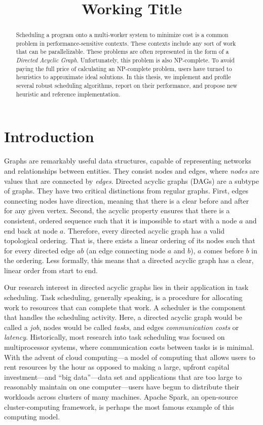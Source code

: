 \documentclass[11pt, oneside]{article}   	%
\title{Working Title}
\date{}
\begin{document}
\maketitle

\begin{abstract}

Scheduling a program onto a multi-worker system to minimize cost is a common problem in performance-sensitive contexts. These contexts include any sort of work that can be parallelizable. These problems are often represented in the form of a \emph{Directed Acyclic Graph}. Unfortunately, this problem is also NP-complete. To avoid paying the full price of calculating an NP-complete problem, users have turned to heuristics to approximate ideal solutions. In this thesis, we implement and profile several robust scheduling algorithms, report on their performance, and propose new heuristic and reference implementation.

\end{abstract}

\section{Introduction}

Graphs are remarkably useful data structures, capable of representing networks and relationships between entities. They consist nodes and edges, where \emph{nodes} are values that are connected by \emph{edges}. Directed acyclic graphs (DAGs) are a subtype of graphs. They have two critical distinctions from regular graphs. First, edges connecting nodes have direction, meaning that there is a clear before and after for any given vertex. Second, the acyclic property ensures that there is a consistent, ordered sequence such that it is impossible to start with a node $a$ and end back at node $a$. Therefore, every directed acyclic graph has a valid topological ordering. That is, there exists a linear ordering of its nodes such that for every directed edge $ab$ (an edge connecting node $a$ and $b$), $a$ comes before $b$ in the ordering. Less formally, this means that a directed acyclic graph has a clear, linear order from start to end.

Our research interest in directed acyclic graphs lies in their application in task scheduling.  Task scheduling, generally speaking, is a procedure for allocating work to resources that can complete that work. A scheduler is the component that handles the scheduling activity. Here, a directed acyclic graph would be called a \emph{job}, nodes would be called \emph{tasks}, and edges \emph{communication costs} or \emph{latency}. Historically, most research into task scheduling was focused on multiprocessor systems, where communication costs between tasks is is minimal. With the advent of cloud computing---a model of computing that allows users to rent resources by the hour as opposed to making a large, upfront capital investment---and ``big data''---data set and applications that are too large to reasonably maintain on one computer---users have begun to distribute their workloads across clusters of many machines. Apache Spark, an open-source cluster-computing framework, is perhaps the most famous example of this computing model. 
\end{document}
